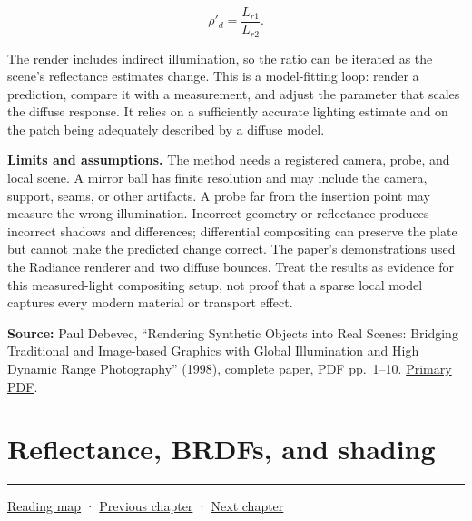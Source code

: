 \[\rho'_d=\frac{L_{r1}}{L_{r2}}.\]

The render includes indirect illumination, so the ratio can be iterated as the scene's reflectance estimates change. This is a model-fitting loop: render a prediction, compare it with a measurement, and adjust the parameter that scales the diffuse response. It relies on a sufficiently accurate lighting estimate and on the patch being adequately described by a diffuse model.

\textbf{Limits and assumptions.} The method needs a registered camera, probe, and local scene. A mirror ball has finite resolution and may include the camera, support, seams, or other artifacts. A probe far from the insertion point may measure the wrong illumination. Incorrect geometry or reflectance produces incorrect shadows and differences; differential compositing can preserve the plate but cannot make the predicted change correct. The paper's demonstrations used the Radiance renderer and two diffuse bounces. Treat the results as evidence for this measured-light compositing setup, not proof that a sparse local model captures every modern material or transport effect.

\textbf{Source:} Paul Debevec, ``Rendering Synthetic Objects into Real Scenes: Bridging Traditional and Image-based Graphics with Global Illumination and High Dynamic Range Photography'' (1998), complete paper, PDF pp.~1--10. \href{https://www.pauldebevec.com/Research/IBL/debevec-siggraph98.pdf}{Primary PDF}.

\section{Reflectance, BRDFs, and shading}\label{03-visual-computing-i-ch004-reflectance-brdfs-and-shading}

\begin{center}\rule{0.5\linewidth}{0.5pt}\end{center}

\hyperref[volume-reading-map]{Reading map} · \hyperref[03-visual-computing-i-ch003-lens-optics-and-image-formation]{Previous chapter} · \hyperref[03-visual-computing-i-ch005-reflectance-materials-and-light-transport]{Next chapter}
